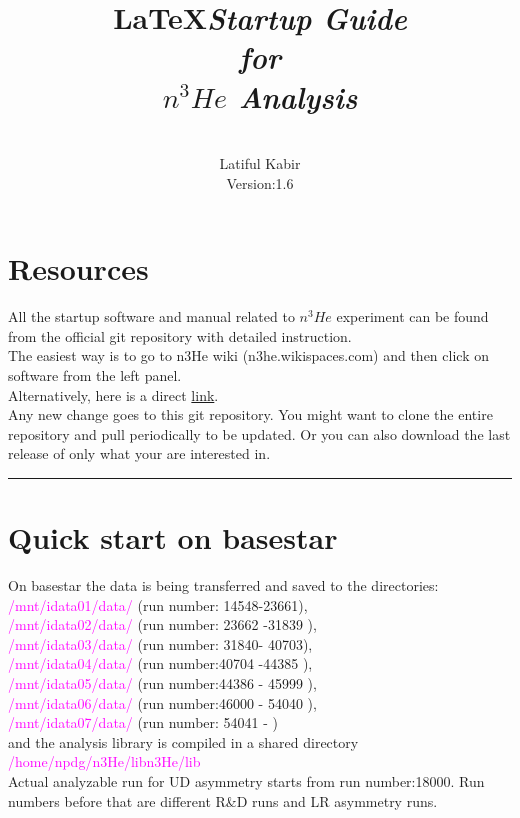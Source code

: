 \documentclass[12pt]{article}
\title{\LaTeX}
\date{}
\title{\emph{\huge\textbf{Startup Guide \\ for \\$n^3He$ Analysis}}
}
\author{\\Latiful Kabir\\
Version:1.6
}
\begin{document}
  \maketitle
  
\newpage  
\tableofcontents
\newpage
\setcounter{tocdepth}{2}

\section{Resources}
All the startup software and manual related to $n^3He$ experiment can be found from the official git repository with detailed instruction. \\
The easiest way is to go to n3He wiki (n3he.wikispaces.com) and then click on software from the left panel.  \\
Alternatively, here is a direct \href{http://latifkabir.github.io/n3He_Soft/}{link}.\\
Any new change goes to this  git repository. You might want to clone the entire repository and pull periodically to be updated. Or you can also download the last release of only what your are interested in.  

\noindent
{\color{red} \rule{\linewidth}{1mm} }
 
\newpage
\section{Quick start on basestar}
On basestar the data is being transferred and saved to the directories: \\ \textcolor{magenta}{ /mnt/idata01/data/ } (run number: 14548-23661),\\ \textcolor{magenta}{ /mnt/idata02/data/ } (run number: 23662 -31839 ),\\ \textcolor{magenta}{ /mnt/idata03/data/ } (run number: 31840- 40703),\\ \textcolor{magenta}{ /mnt/idata04/data/ } (run number:40704 -44385 ),\\ \textcolor{magenta}{ /mnt/idata05/data/ } (run number:44386 - 45999 ),\\ \textcolor{magenta}{ /mnt/idata06/data/ } (run number:46000 - 54040 ),\\ \textcolor{magenta}{ /mnt/idata07/data/ } (run number: 54041 - )\\and the analysis library is compiled in a shared directory \textcolor{magenta}{ /home/npdg/n3He/libn3He/lib} \\

Actual analyzable run for UD asymmetry starts from run  number:18000. Run numbers before that are different R\&D runs and LR asymmetry runs. \\
\end{document}
